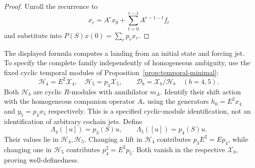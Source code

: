 \documentclass[11pt]{amsart}
\begin{document}
\begin{proof}
Unroll the recurrence to
\[
x_r=A^rx_0+\sum_{t=0}^{r-1}A^{r-1-t}f_t
\]
and substitute into $P(S)x(0)=\sum_rp_rx_r$.
\end{proof}

The displayed formula computes a landing from an initial state and forcing
jet. To specify the complete family independently of homogeneous ambiguity,
use the fixed cyclic temporal modules of Proposition~\ref{prop:temporal-minimal}:
\[
\mathcal H_4=E^2\mathcal X_4,\quad
\mathcal H_5=p_4\mathcal X_5,\qquad
\mathscr D_b=\mathcal X_b/\mathcal H_b\quad(b=4,5).
\]
Both $\mathcal H_b$ are cyclic $R$-modules with annihilator $m_A$.
Identify their shift action with the homogeneous companion operator $A_*$
using the generators $h_0=E^2x_4$ and $y_5=p_4x_5$ respectively.
This is a specified cyclic-module identification, not an identification
of arbitrary cochain jets. Define
\[
\Lambda_4([u])=p_3(S)u,\qquad \Lambda_5([u])=p_4(S)u.
\]
Their values lie in $\mathcal H_4,\mathcal H_5$. Changing a lift in
$\mathcal H_4$ contributes $p_3E^2=Ep_4$, while changing one in
$\mathcal H_5$ contributes $p_4^2=E^2p_5$. Both vanish in the respective
$\mathcal X_b$, proving well-definedness.
\end{document}

